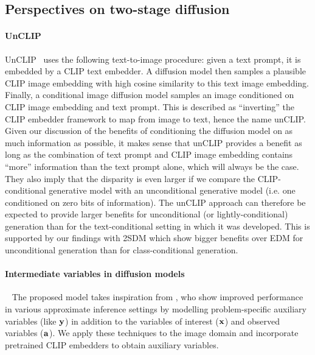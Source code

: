 \subsection{Perspectives on two-stage diffusion}
\paragraph{UnCLIP} \label{sec:unclip}
UnCLIP~\citep{ramesh2022hierarchical} uses the following text-to-image procedure: given a text prompt, it is embedded by a CLIP text embedder. A diffusion model then samples a plausible CLIP image embedding with high cosine similarity to this text image embedding. Finally, a conditional image diffusion model samples an image conditioned on CLIP image embedding and text prompt. This is described as ``inverting'' the CLIP embedder framework to map from image to text, hence the name unCLIP. Given our discussion of the benefits of conditioning the diffusion model on as much information as possible, it makes sense that unCLIP provides a benefit as long as the combination of text prompt and CLIP image embedding contains ``more'' information than the text prompt alone, which will always be the case. They also imply that the disparity is even larger if we compare the CLIP-conditional generative model with an unconditional generative model (i.e. one conditioned on zero bits of information). The unCLIP approach can therefore be expected to provide larger benefits for unconditional (or lightly-conditional) generation than for the text-conditional setting in which it was developed. This is supported by our findings with 2SDM which show bigger benefits over EDM for unconditional generation than for class-conditional generation.

\paragraph{Intermediate variables in diffusion models}~
 The proposed model takes inspiration from \citet{weilbach2023graphically}, %
who show improved performance in various approximate inference settings by modelling problem-specific auxiliary variables (like ${\mathbf{y}}$) in addition to the variables of interest (${\mathbf{x}}$) and observed variables (${\mathbf{a}}$). We apply these techniques to the image domain and incorporate pretrained CLIP embedders to obtain auxiliary variables.

